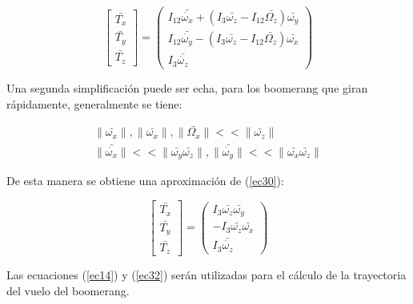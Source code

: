 		\begin{equation}
		\begin{bmatrix}
	  	\bar{T_{x}}\\
  		\bar{T_{y}}\\
  		\bar{T_{z}}
  		\end{bmatrix} =
  		\begin{pmatrix}
        I_{12}\bar{\dot{\omega_{x}}} + (I_{3}\bar{\omega_{z}}-I_{12}\bar{\Omega_{z}})\bar{\omega_{y}}\\
        I_{12}\bar{\dot{\omega_{y}}} - (I_{3}\bar{\omega_{z}}-I_{12}\bar{\Omega_{z}})\bar{\omega_{x}}\\
        I_{3}\bar{\dot{\omega_{z}}}
  		\end{pmatrix}
		\label{ec30}
		\end{equation} %

	Una segunda simplificación puede ser echa, para los boomerang que giran rápidamente, generalmente se tiene:

		\begin{subequations}
    	\begin{align}
    	\| \bar{\omega_{x}} \| , \| \bar{\omega_{x}} \|, \| \bar{\Omega_{x}} \| << \| \bar{\omega_{z}} \| \\
    	\| \bar{\dot{\omega_{x}}} \| << \| \bar{\omega_{y}}\bar{\omega_{z}} \| , \| \bar{\dot{\omega_{y}}} \| << \| \bar{\omega_{x}}\bar{\omega_{z}} \|
    	\end{align}
		\label{ec31}
		\end{subequations} %

	De esta manera se obtiene una aproximación de (\ref{ec30}):

		\begin{equation}
		\begin{bmatrix}
	  	\bar{T_{x}}\\
  		\bar{T_{y}}\\
  		\bar{T_{z}}
  		\end{bmatrix} =
  		\begin{pmatrix}
         I_{3}\bar{\omega_{z}}\bar{\omega_{y}}\\
        -I_{3}\bar{\omega_{z}}\bar{\omega_{x}}\\
        I_{3}\bar{\dot{\omega_{z}}}
  		\end{pmatrix}
		\label{ec32}
		\end{equation}

	Las ecuaciones (\ref{ec14}) y (\ref{ec32}) serán utilizadas para el cálculo de la trayectoria del vuelo del boomerang.


